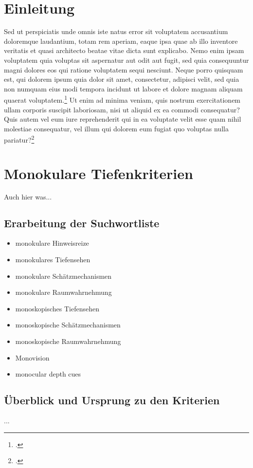 \section{Einleitung}
Sed ut perspiciatis unde omnis iste natus error sit voluptatem accusantium doloremque laudantium, totam rem aperiam, eaque ipsa quae ab illo inventore veritatis et quasi architecto beatae vitae dicta sunt explicabo. Nemo enim ipsam voluptatem quia voluptas sit aspernatur aut odit aut fugit, sed quia consequuntur magni dolores eos qui ratione voluptatem sequi nesciunt. Neque porro quisquam est, qui dolorem ipsum quia dolor sit amet, consectetur, adipisci velit, sed quia non numquam eius modi tempora incidunt ut labore et dolore magnam aliquam quaerat voluptatem.\footcite[Vgl.][]{testOnline} Ut enim ad minima veniam, quis nostrum exercitationem ullam corporis suscipit laboriosam, nisi ut aliquid ex ea commodi consequatur? Quis autem vel eum iure reprehenderit qui in ea voluptate velit esse quam nihil molestiae consequatur, vel illum qui dolorem eum fugiat quo voluptas nulla pariatur?\footcite[Vgl.][S. 83]{testBuch}

\section{Monokulare Tiefenkriterien}
Auch hier was...

\subsection{Erarbeitung der Suchwortliste}
\begin{itemize}
\item monokulare Hinweisreize 
\item monokulares Tiefensehen
\item monokulare Schätzmechanismen
\item monokulare Raumwahrnehmung
\item monoskopisches Tiefensehen
\item monoskopische Schätzmechanismen
\item monoskopische Raumwahrnehmung
\item Monovision
\item monocular depth cues
\end{itemize}


\subsection{Überblick und Ursprung zu den Kriterien}
...

